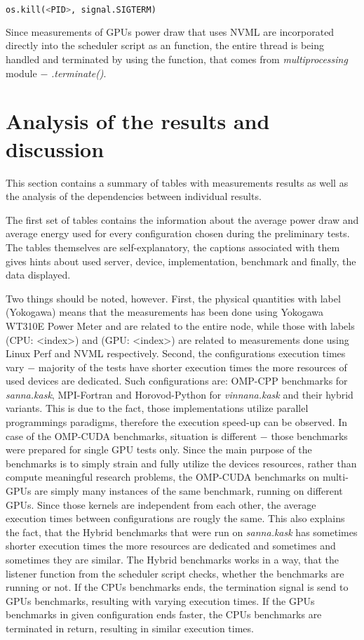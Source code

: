 \begin{lstlisting}[language=Python]
    os.kill(<PID>, signal.SIGTERM)
\end{lstlisting}

Since measurements of GPUs power draw that uses NVML are incorporated directly
into the scheduler script as an function, the entire thread is being handled
and terminated by using the function, that comes from \emph{multiprocessing}
module $-$ \emph{.terminate\@()}.

\section{Analysis of the results and discussion}

This section contains a summary of tables with measurements results as well as
the analysis of the dependencies between individual results.

The first set of tables contains the information about the average power draw
and average energy used for every configuration chosen during the preliminary
tests. The tables themselves are self-explanatory, the captions associated
with them gives hints about used server, device, implementation, benchmark
and finally, the data displayed. 

Two things should be noted, however. First, the physical quantities with label
(Yokogawa) means that the measurements has been done using Yokogawa WT310E
Power Meter and are related to the entire node, while those with labels
(CPU\@: <index>) and (GPU\@: <index>) are related to measurements done using
Linux Perf and NVML respectively. Second, the configurations execution
times vary $-$ majority of the tests have shorter execution times the more
resources of used devices are dedicated. Such configurations are\@:
OMP-CPP benchmarks for \emph{sanna.kask}, MPI-Fortran and Horovod-Python
for \emph{vinnana.kask} and their hybrid variants. This is due to the fact,
those implementations utilize parallel programmings paradigms, therefore the
execution speed-up can be observed. In case of the OMP-CUDA benchmarks,
situation is different $-$ those benchmarks were prepared for single GPU tests
only. Since the main purpose of the benchmarks is to simply strain and fully
utilize the devices resources, rather than compute meaningful research
problems, the OMP-CUDA benchmarks on multi-GPUs are simply many instances of
the same benchmark, running on different GPUs. Since those kernels are
independent from each other, the average execution times between configurations
are rougly the same. This also explains the fact, that the Hybrid benchmarks
that were run on \emph{sanna.kask} has sometimes shorter execution times the
more resources are dedicated and sometimes and sometimes they are similar.
The Hybrid benchmarks works in a way, that the listener function from the
scheduler script checks, whether the benchmarks are running or not. If the
CPUs benchmarks ends, the termination signal is send to GPUs benchmarks,
resulting with varying execution times. If the GPUs benchmarks in given
configuration ends faster, the CPUs benchmarks are terminated in return,
resulting in similar execution times.



